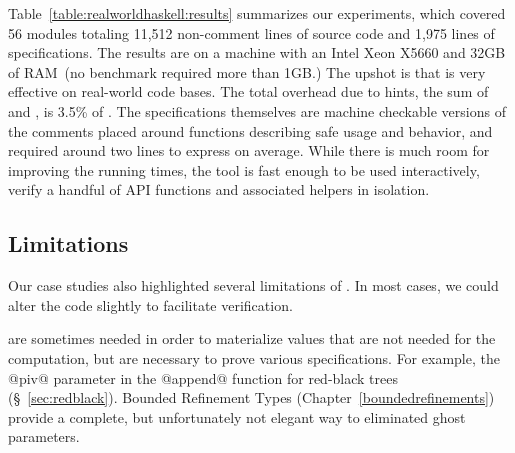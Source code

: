 Table~\ref{table:realworldhaskell:results} summarizes our experiments, which covered 56 modules
totaling 11,512 non-comment lines of source code and 1,975 lines of specifications.
%
The results are on a machine with an Intel Xeon X5660 and 32GB of RAM~(no benchmark required more than 1GB.)
%
The upshot is that \toolname is very effective on real-world code bases.
%
The total overhead due to hints, \ie the sum of \bfAnnot and \bfQualif, is 3.5\% of \bfLOC.
%
The specifications themselves are machine checkable versions of the comments 
placed around functions describing safe usage and behavior, and required around
two lines to express on average.
%
%
%
%
While there is much room for improving the running times, the tool is fast enough 
to be used interactively, verify a handful of API functions and associated helpers 
in isolation.

\subsection{Limitations}\label{sec:discussion}

Our case studies also highlighted several limitations
of \toolname. 
In most cases, we could alter the code slightly to 
facilitate verification. 

 are sometimes needed in 
order to materialize values that are not needed 
for the computation, but are necessary to prove 
various specifications. For example, the @piv@ 
parameter in the @append@ function for red-black trees
(\S~\ref{sec:redblack}).
%
Bounded Refinement Types (Chapter~\ref{boundedrefinements})
provide a complete, but unfortunately not elegant way to 
eliminated ghost parameters.

